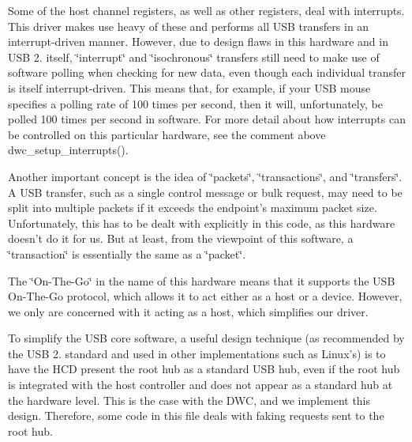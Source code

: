 Some of the host channel registers, as well as other registers, deal with interrupts. This driver makes use heavy of these and performs all U\-S\-B transfers in an interrupt-\/driven manner. However, due to design flaws in this hardware and in U\-S\-B 2. itself, \char`\"{}interrupt\char`\"{} and \char`\"{}isochronous\char`\"{} transfers still need to make use of software polling when checking for new data, even though each individual transfer is itself interrupt-\/driven. This means that, for example, if your U\-S\-B mouse specifies a polling rate of 100 times per second, then it will, unfortunately, be polled 100 times per second in software. For more detail about how interrupts can be controlled on this particular hardware, see the comment above dwc\-\_\-setup\-\_\-interrupts().

Another important concept is the idea of \char`\"{}packets\char`\"{}, \char`\"{}transactions\char`\"{}, and \char`\"{}transfers\char`\"{}. A U\-S\-B transfer, such as a single control message or bulk request, may need to be split into multiple packets if it exceeds the endpoint's maximum packet size. Unfortunately, this has to be dealt with explicitly in this code, as this hardware doesn't do it for us. But at least, from the viewpoint of this software, a \char`\"{}transaction\char`\"{} is essentially the same as a \char`\"{}packet\char`\"{}.

The \char`\"{}\-On-\/\-The-\/\-Go\char`\"{} in the name of this hardware means that it supports the U\-S\-B On-\/\-The-\/\-Go protocol, which allows it to act either as a host or a device. However, we only are concerned with it acting as a host, which simplifies our driver.

To simplify the U\-S\-B core software, a useful design technique (as recommended by the U\-S\-B 2. standard and used in other implementations such as Linux's) is to have the H\-C\-D present the root hub as a standard U\-S\-B hub, even if the root hub is integrated with the host controller and does not appear as a standard hub at the hardware level. This is the case with the D\-W\-C, and we implement this design. Therefore, some code in this file deals with faking requests sent to the root hub. 